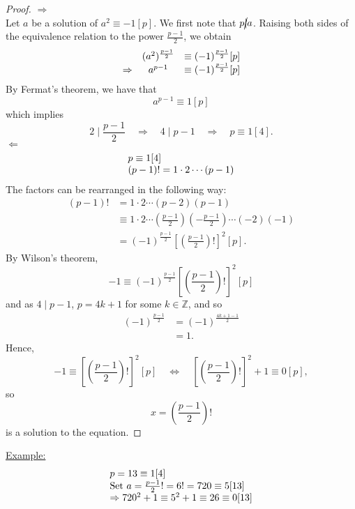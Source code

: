 \documentclass{report}
\begin{document}
\begin{proof}
\underline{$\Rightarrow$}\\
Let $a$ be a solution of $a^2 \equiv -1[p]$. We first note that $p\cancel{\mid}a$. Raising both sides of the equivalence relation to the power $\frac{p-1}{2}$, we obtain
\[
\begin{array}{r c l}
&(a^2)^{\frac{p-1}{2}}& \equiv (-1)^{\frac{p-1}{2}}[p]\\
\Rightarrow &a^{p-1}&\equiv (-1)^{\frac{p-1}{2}}[p]
\end{array}
\]
By Fermat's theorem, we have that \[a^{p-1}\equiv 1 [p]\] which implies \[2\mid \frac{p-1}{2}\quad \Rightarrow \quad 4\mid p-1\quad \Rightarrow \quad p\equiv 1[4].\]
\underline{$\Leftarrow$}\\
\[
\begin{array}{l c l}
p \equiv 1[4]\\
(p-1)!=1\cdot 2\cdots (p-1)\\
\end{array}
\]
The factors can be rearranged in the following way:
\begin{equation*}
\begin{aligned}
(p-1)! &= 1\cdot 2\cdots (p-2)(p-1)\\
&\equiv 1\cdot 2\cdots \left(\frac{p-1}{2}\right)\left(-\frac{p-1}{2}\right)\cdots (-2)(-1)\\
&=(-1)^{\frac{p-1}{2}}\left[\left(\frac{p-1}{2}\right)!\right]^2[p].
\end{aligned}
\end{equation*}
By Wilson's theorem, \begin{equation*}
-1\equiv(-1)^{\frac{p-1}{2}}\left[\left(\frac{p-1}{2}\right)!\right]^2[p] 
\end{equation*}
and as $4\mid p-1$, $p=4k + 1$ for some $k\in \mathbb{Z}$, and so \begin{equation*}
\begin{aligned}
(-1)^{\frac{p-1}{2}}&=(-1)^{\frac{4k + 1-1}{2}}\\
&=1.
\end{aligned}
\end{equation*}
Hence, 
\begin{equation*}
-1\equiv\left[\left(\frac{p-1}{2}\right)!\right]^2[p]
\quad\iff\quad
\left[\left(\frac{p-1}{2}\right)!\right]^2+1\equiv 0[p],
\end{equation*}
so
\begin{equation*}
x=\left(\frac{p-1}{2}\right)!
\end{equation*}
is a solution to the equation.
\end{proof}
\underline{Example:} 
\[
\begin{array}{l c l}
p=13 \equiv 1[4]\\
\text{Set } a=\frac{p-1}{2}!=6!=720 \equiv 5 [13]\\
\Rightarrow 720^2+1 \equiv 5^2+1 \equiv 26 \equiv 0[13]\\
\end{array}
\]
\end{document}
